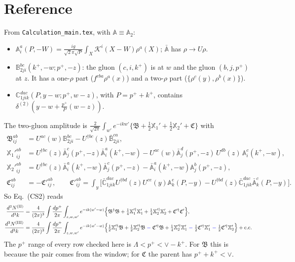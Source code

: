 \documentclass[10pt]{article}
\numberwithin{equation}{section}
\def\mf#1{\mathbb{#1}}
\newcommand{\KK}{\mathcal K}
\begin{document}
\section{Reference}\label{sec:ref}
From \texttt{Calculation\_main.tex}, with $\mf A\equiv\mf A_2$:
\begin{itemize}
\item $\mf A^{a}_{i}(P,-W)=\frac{ig}{\sqrt2\pi\sqrt{P}}\int_X\KK^i(X-W)\rho^a(X)$; $\bar{\mf A}$ has $\rho\to U\rho$.
\item $\mf B^{bc}_{2ji}(k^+,-w;p^+,-z)$: the gluon $(c,i,k^+)$ is at $w$ and the gluon $(b,j,p^+)$ at $z$. It has a one-$\rho$ part ($f^{cba}\rho^a(x)$) and a two-$\rho$ part ($\{\rho^c(y),\rho^b(x)\}$).
\item $\mf C^{dac}_{1jik}(P,y-w;p^+,w-z)$, with $P=p^++k^+$, contains $\delta^{(2)}(y-w+\frac{p^+}{P}(w-z))$.
\end{itemize}
The two-gluon amplitude is $\frac{2}{\sqrt{2\pi}}\int_{w'}e^{-ikw'}\{\mathfrak B+\frac12\mathbb X_1'+\frac12\mathbb X_2'+\mathfrak C\}$ with
\begin{align}
\mathfrak B^{ab}_{ij}&=U^{ac}(w)\mf B^{bc}_{2ji}-U^{\dagger bc}(z)\bar{\mf B}^{ca}_{2ji},\\
{\mathbb X_1'}^{ab}_{ij}&=U^{\dagger bc}(z)\bar{\mf A}^c_j(p^+,-z)\bar{\mf A}^a_i(k^+,-w)-U^{ac}(w)\bar{\mf A}^d_j(p^+,-z)\,U^{db}(z)\,\mf A^c_i(k^+,-w),\\
{\mathbb X_2'}^{ab}_{ij}&=U^{\dagger bc}(z)\bar{\mf A}^a_i(k^+,-w)\bar{\mf A}^c_j(p^+,-z)-\bar{\mf A}^a_i(k^+,-w)\mf A^b_j(p^+,-z),\\
\mathfrak C^{ab}_{ij}&=-\mathfrak C'^{ab}_{ij},\qquad \mathfrak C'^{ab}_{ij}=\int_y\Big[\bar{\mf C}^{dac}_{1jik}U^{\dagger bd}(z)U^{ce}(y)\mf A^e_k(P,-y)-U^{\dagger bd}(z)\bar{\mf C}^{dac}_{1jik}\bar{\mf A}^c_k(P,-y)\Big].
\end{align}
So Eq.~(CS2) reads
\begin{align}
\frac{d^3N^{\rm (II)}}{d^3k}&=\frac{4}{(2\pi)^3}\int\frac{dp^+}{2\pi}\int_{z,w,w'}e^{-ik(w'-w)}\Big\{\mathfrak B^\dagger\mathfrak B+\tfrac14\mathbb X_1'^\dagger\mathbb X_1'+\tfrac14\mathbb X_2'^\dagger\mathbb X_2'+\mathfrak C'^\dagger\mathfrak C'\Big\},\\
\frac{d^3N^{\rm (III)}}{d^3k}&=\frac{4}{(2\pi)^3}\int\frac{dp^+}{2\pi}\int_{z,w,w'}e^{-ik(w'-w)}\Big\{\tfrac12\mathbb X_1'^\dagger\mathfrak B+\tfrac12\mathbb X_2'^\dagger\mathfrak B\;{\color{blue}-}\;\mathfrak C'^\dagger\mathfrak B+\tfrac14\mathbb X_2'^\dagger\mathbb X_1'\;{\color{blue}-}\;\tfrac12\mathfrak C'^\dagger\mathbb X_1'\;{\color{blue}-}\;\tfrac12\mathfrak C'^\dagger\mathbb X_2'\Big\}+{\rm c.c.}
\end{align}
The $p^+$ range of every row checked here is $\Lambda<p^+<\vee-k^+$. For $\mathfrak B$ this is because the pair comes from the window; for $\mathfrak C$ the parent has $p^++k^+<\vee$.
\end{document}
